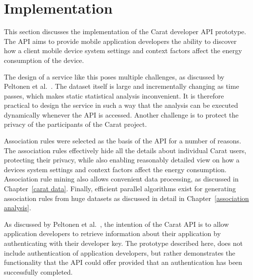 \section{Implementation}

This section discusses the implementation of the Carat developer API prototype. The API aims to provide mobile application developers the ability to discover how a client mobile device system settings and context factors affect the energy consumption of the device.

The design of a service like this poses multiple challenges, as discussed by Peltonen et al.~\cite{7840871}. The dataset itself is large and incrementally changing as time passes, which makes static statistical analysis inconvenient. It is therefore practical to design the service in such a way that the analysis can be executed dynamically whenever the API is accessed. Another challenge is to protect the privacy of the participants of the Carat project.

Association rules were selected as the basis of the API for a number of reasons. The association rules effectively hide all the details about individual Carat users, protecting their privacy, while also enabling reasonably detailed view on how a devices system settings and context factors affect the energy consumption. Association rule mining also allows convenient data processing, as discussed in Chapter~\ref{carat data}. Finally, efficient parallel algorithms exist for generating association rules from huge datasets as discussed in detail in Chapter~\ref{association analysis}.

As discussed by Peltonen et al.~\cite{7840871}, the intention of the Carat API is to allow application developers to retrieve information about their application by authenticating with their developer key. The prototype described here, does not include authentication of application developers, but rather demonstrates the functionality that the API could offer provided that an authentication has been successfully completed. 

